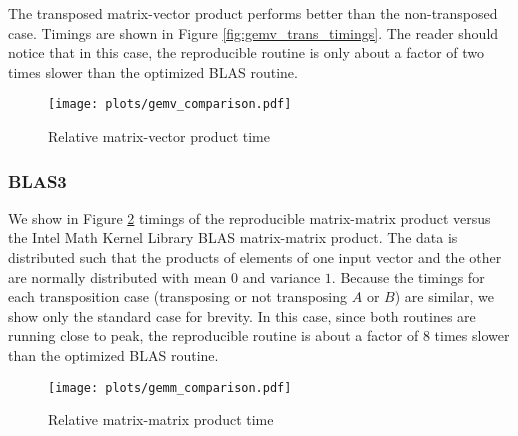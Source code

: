   The transposed matrix-vector product performs better than the non-transposed case. Timings are shown in Figure \ref{fig:gemv_trans_timings}. The reader should notice that in this case, the reproducible routine is only about a factor of two times slower than the optimized BLAS routine.
  \begin{figure}[H]
  \begin{center}
  \texttt{[image: plots/gemv\_comparison.pdf]}
  \caption{Relative matrix-vector product time}
  \label{fig:gemv_timings}
  \end{center}
  \end{figure}

  \subsubsection{BLAS3}
    We show in Figure \ref{fig:gemm_timings} timings of the reproducible matrix-matrix product versus the Intel Math Kernel Library \cite{MKL} BLAS matrix-matrix product. The data is distributed such that the products of elements of one input vector and the other are normally distributed with mean $0$ and variance $1$. Because the timings for each transposition case (transposing or not transposing $A$ or $B$) are similar, we show only the standard case for brevity. In this case, since both routines are running close to peak, the reproducible routine is about a factor of 8 times slower than the optimized BLAS routine.
  \begin{figure}[H]
  \begin{center}
  \texttt{[image: plots/gemm\_comparison.pdf]}
  \caption{Relative matrix-matrix product time}
  \label{fig:gemm_timings}
  \end{center}
  \end{figure}
